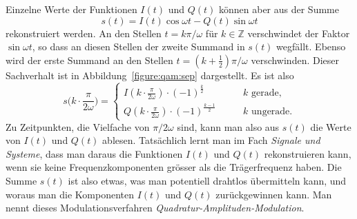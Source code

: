 Einzelne Werte der Funktionen $I(t)$ und $Q(t)$ können aber aus der Summe
\[
s(t)
=
I(t)\cos\omega t - Q(t)\sin\omega t
\]
rekonstruiert werden.
An den Stellen $t = k\pi/\omega$ für $k\in\mathbb Z$ verschwindet
der Faktor $\sin\omega t$,
so dass an diesen Stellen der zweite Summand in $s(t)$ wegfällt.
Ebenso wird der erste Summand an den Stellen
$t = (k+\frac12)\pi/\omega$ verschwinden.
Dieser Sachverhalt ist in Abbildung~\ref{figure:qam:sep} dargestellt.
Es ist also
\[
s\biggl(k\cdot \frac{\pi}{2\omega}\biggr)
=
\begin{cases}
I(k\cdot \frac{\pi}{2\omega})\cdot(-1)^{\frac{k}2}
&\qquad \text{$k$ gerade,}\\[5pt]
Q(k\cdot \frac{\pi}{2\omega})\cdot(-1)^{\frac{k-1}2}
&\qquad \text{$k$ ungerade.}
\end{cases}
\]
Zu Zeitpunkten, die Vielfache von $\pi/2\omega$ sind, kann man also aus
$s(t)$ die Werte von $I(t)$ und $Q(t)$ ablesen.
Tatsächlich lernt man im Fach {\em Signale und Systeme}, dass man daraus
die Funktionen $I(t)$ und $Q(t)$ rekonstruieren kann, wenn sie keine
Frequenzkomponenten grösser als die Trägerfrequenz haben.
Die Summe $s(t)$ ist also etwas, was man potentiell drahtlos übermitteln
kann, und woraus man die Komponenten $I(t)$ und $Q(t)$ zurückgewinnen kann.
Man nennt dieses Modulationsverfahren {\em Quadratur-Amplituden-Modulation}.

